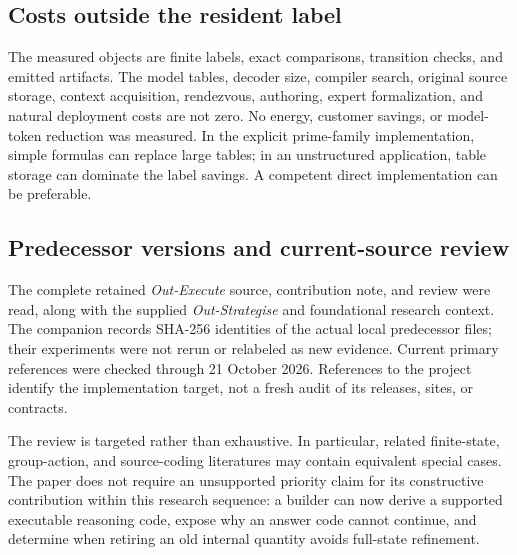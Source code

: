 \documentclass[11pt,letterpaper]{article}
\theoremstyle{remark}\newtheorem{remark}{Remark}[section]
\begin{document}
\subsection{Costs outside the resident label}
The measured objects are finite labels, exact comparisons, transition checks, and emitted artifacts. The model tables, decoder size, compiler search, original source storage, context acquisition, rendezvous, authoring, expert formalization, and natural deployment costs are not zero. No energy, customer savings, or model-token reduction was measured. In the explicit prime-family implementation, simple formulas can replace large tables; in an unstructured application, table storage can dominate the label savings. A competent direct implementation can be preferable.

\subsection{Predecessor versions and current-source review}
The complete retained \emph{Out-Execute} source, contribution note, and review were read, along with the supplied \emph{Out-Strategise} and foundational research context. The companion records SHA-256 identities of the actual local predecessor files; their experiments were not rerun or relabeled as new evidence. Current primary references were checked through 21 October 2026. References to the project identify the implementation target, not a fresh audit of its releases, sites, or contracts.

The review is targeted rather than exhaustive. In particular, related finite-state, group-action, and source-coding literatures may contain equivalent special cases. The paper does not require an unsupported priority claim for its constructive contribution within this research sequence: a builder can now derive a supported executable reasoning code, expose why an answer code cannot continue, and determine when retiring an old internal quantity avoids full-state refinement.
\end{document}
